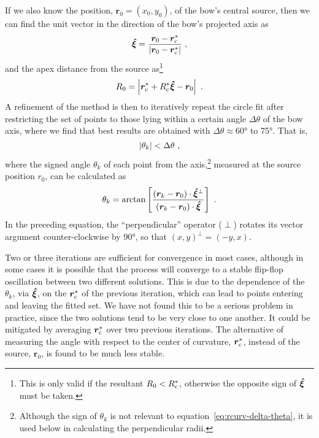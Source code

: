 If we also know the position, \(\bm{r}_0 = (x_0, y_0)\), of the bow's
central source, then we can find the unit vector in the direction of
the bow's projected axis as
\begin{equation}
  \label{eq:rcurv-axis-vector}
  \bm{\hat{\xi}} = \frac {\bm{r}_0 - \bm{r}_{\mathrm{c}}^*} { \lvert\bm{r}_0 - \bm{r}_{\mathrm{c}}^*\rvert} \ , 
\end{equation}
and the apex distance from the source as\footnote{%
  This is only valid if the resultant \(R_0 < R_{\mathrm{c}}^*\), otherwise
  the opposite sign of \(\bm{\hat{\xi}}\) must be taken.}
\begin{equation}
  \label{eq:rcurv-apex-distance}
  R_0 = \Abs{\bm{r}_{\C}^* + R_{\C}^* \uvec{\xi} - \bm{r}_0} \ .
\end{equation}
A refinement of the method is then to iteratively repeat the circle
fit after restricting the set of points to those lying within a
certain angle \(\Delta\theta\) of the bow axis, where we find that best results
are obtained with \(\Delta\theta \approx \ang{60}\) to \ang{75}.  That is, 
\begin{equation}
  \label{eq:rcurv-delta-theta}
  \left\lvert\theta_k\right\rvert < \Delta\theta \ , 
\end{equation}
where the signed angle \(\theta_k\) of each point from the
axis,\footnote{%
  Although the sign of \(\theta_k\) is not relevant to
  equation~\eqref{eq:rcurv-delta-theta}, it is used below in
  calculating the perpendicular radii.  } %
measured at the source position \(r_0\), can be calculated as
\begin{equation}
  \label{eq:rcurv-theta-k}
  \theta_k = \arctan \left[  
    \frac{\left( \bm{r}_k - \bm{r}_0 \right) \cdot \bm{\hat{\xi}}^\perp}
    {\left( \bm{r}_k - \bm{r}_0 \right) \cdot \bm{\hat{\xi}}}
  \right] \ .
\end{equation}
In the preceding equation, the ``perpendicular'' operator (\(\perp\))
rotates its vector argument counter-clockwise by \ang{90}, so that
\((x, y)^\perp = (-y, x)\).
  
Two or three iterations are sufficient for convergence in most cases,
although in some cases it is possible that the process will converge
to a stable flip-flop oscillation between two different solutions.
This is due to the dependence of the \(\theta_k\), via \(\bm{\hat{\xi}}\), on
the \(\bm{r}_{\mathrm{c}}^*\) of the previous iteration, which can lead to
points entering and leaving the fitted set.  We have not found this to
be a serious problem in practice, since the two solutions tend to be
very close to one another.  It could be mitigated by averaging
\(\bm{r}_{\mathrm{c}}^*\) over two previous iterations.  The alternative of
measuring the angle with respect to the center of curvature,
\(\bm{r}_{\mathrm{c}}^*\), instead of the source, \(\bm{r}_0\), is found to be
much less stable.

